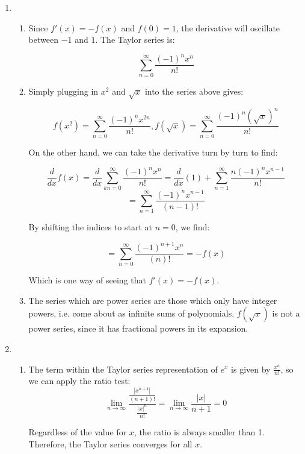 		\begin{enumerate}
			\item 
            \begin{enumerate} 
            \item Since $f'(x) = -f(x)$ and $f(0) = 1$, the derivative will oscillate between $-1$ and $1$. The Taylor series is:

            \[\sum_{n=0}^\infty \frac{(-1)^nx^n}{n!}\]

            \item Simply plugging in $x^2$ and $\sqrt{x}$ into the series above gives:

            \[f(x^2)=\sum_{n=0}^\infty \frac{(-1)^nx^{2n}}{n!}, f(\sqrt{x}) = \sum_{n=0}^\infty \frac{(-1)^n(\sqrt{x})^n}{n!}\]

            On the other hand, we can take the derivative turn by turn to find:

            \[\frac{d}{dx}f(x) = \frac{d}{dx} \sum_{k
        n=0}^\infty \frac{(-1)^nx^n}{n!} = \frac{d}{dx}(1)+\sum_{n=1}^\infty \frac{n(-1)^nx^{n-1}} {n!}\]
            \[= \sum_{n=1}^\infty \frac{(-1)^nx^{n-1}}{(n-1)!}\]

            By shifting the indices to start at $n=0$, we find:

            \[=\sum_{n=0}^\infty \frac{(-1)^{n+1}x^{n}}{(n)!} = -f(x)\]

            Which is one way of seeing that $f'(x) = -f(x)$. 

            \item The series which are power series are those which only have integer powers, i.e. come about as infinite sums of polynomials. $f(\sqrt{x})$ is not a power series, since it has fractional powers in its expansion. 
            \end{enumerate}

            \item 
            \begin{enumerate}
                \item The term within the Taylor series representation of $e^x$ is given by $\displaystyle \frac{x^n}{n!}$, so we can apply the ratio test:
                \[\lim_{n\to \infty}\frac{\frac{\left|x^{n+1}\right|}{(n+1)!}}{\frac{|x|^n}{n!}} = \lim_{n\to\infty}\frac{|x|}{n+1} = 0\] 
                
                Regardless of the value for $x$, the ratio is always smaller than 1. Therefore, the Taylor series converges for all $x$.


\end{enumerate}
\end{enumerate}
